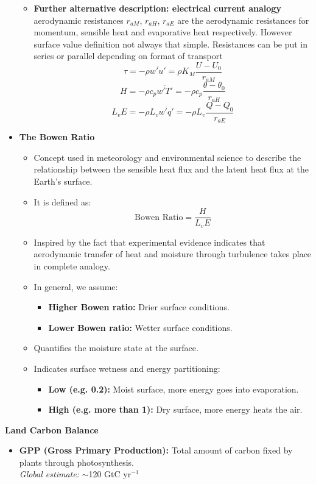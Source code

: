 \documentclass[fontsize=8pt, a4paper, landscape, fleqn]{scrartcl}
\renewcommand{\subsection}[1]{%
    \noindent\colorbox{subsectioncolor}{%
        \parbox{\dimexpr\columnwidth-2\fboxsep}{\color{white}\textbf{#1}}}%
    \vspace{0.5mm}%
}
\begin{document}
\begin{multicols*}{3}[\raggedcolumns]
\begin{itemize}
\begin{itemize}
    \item \textbf{Further alternative description: electrical current analogy} aerodynamic resistances $r_{aM}$, $r_{aH}$, $r_{aE}$ are the aerodynamic resistances for momentum, sensible heat and evaporative heat respectively. However surface value definition not always that simple. Resistances can be put in series or parallel depending on format of transport
    \[
    \tau = -\rho \overline{w'u'} = \rho K_M \frac{U - U_0}{r_{aM}}
    \]
    \[
    H = -\rho c_p \overline{w'T'} = -\rho c_p \frac{\theta - \theta_0}{r_{aH}}
    \]
    \[
    L_v E = -\rho L_v \overline{w'q'} = -\rho L_v \frac{Q - Q_0}{r_{aE}}
    \]
\end{itemize}
\item \textbf{The Bowen Ratio}
\begin{itemize}
    \item Concept used in meteorology and environmental science to describe the relationship between the sensible heat flux and the latent heat flux at the Earth's surface.
    \item It is defined as:
    \[
    \text{Bowen Ratio} = \frac{H}{L_v E}
    \]
    \item Inspired by the fact that experimental evidence indicates that aerodynamic transfer of heat and moisture through turbulence takes place in complete analogy.
    \item In general, we assume:
    \begin{itemize}
        \item \textbf{Higher Bowen ratio:} Drier surface conditions.
        \item \textbf{Lower Bowen ratio:} Wetter surface conditions.
    \end{itemize}
    \item Quantifies the moisture state at the surface.
    \item Indicates surface wetness and energy partitioning:
    \begin{itemize}
        \item \textbf{Low (e.g. 0.2):} Moist surface, more energy goes into evaporation.
        \item \textbf{High (e.g. more than 1):} Dry surface, more energy heats the air.
    \end{itemize}
\end{itemize}
\end{itemize}

\subsection{Land Carbon Balance}
\begin{itemize}
    \item \textbf{GPP (Gross Primary Production):} Total amount of carbon fixed by plants through photosynthesis. \\
    \textit{Global estimate:} $\sim$120 GtC yr$^{-1}$
    

\end{itemize}
\end{multicols*}
\end{document}
